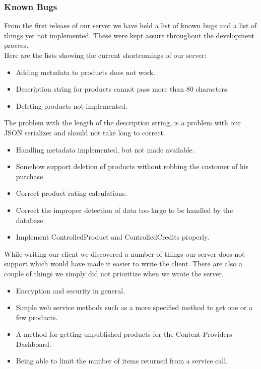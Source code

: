 \subsubsection{Known Bugs}
From the first release of our server we have held a list of known bugs and a list of things yet not implemented. These were kept assure throughout the development process. 
\\Here are the lists showing the current shortcomings of our server:
\begin{itemize}
\item Adding metadata to products does not work.
\item Description string for products cannot pass more than 80 characters.
\item Deleting products not implemented.
\end{itemize}
The problem with the length of the description string, is a problem with our JSON serializer and should not take long to correct.
\begin{itemize}
\item Handling metadata implemented, but not made available.
\item Somehow support deletion of products without robbing the customer of his purchase.
\item Correct product rating calculations.
\item Correct the improper detection of data too large to be handled by the database.
\item Implement ControlledProduct and ControlledCredits properly.
\end{itemize}
While writing our client we discovered a number of things our server does not support which would have made it easier to write the client. There are also a couple of things we simply did not prioritize when we wrote the server.
\begin{itemize}
\item Encryption and security in general.
\item Simple web service methods such as a more specified method to get one or a few products.
\item A method for getting unpublished products for the Content Providers Dashboard.
\item Being able to limit the number of items returned from a service call.
\end{itemize}
